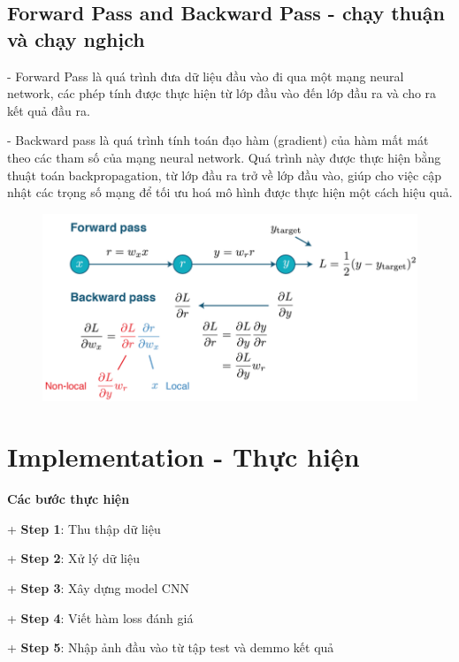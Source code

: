 \documentclass[12pt, a4paper]{article}
\begin{document}
\subsection{Forward Pass and Backward Pass - chạy thuận và chạy nghịch}
\par \hspace{1cm}- Forward Pass là quá trình đưa dữ liệu đầu vào đi qua một mạng neural network, các phép tính được thực hiện từ lớp đầu vào đến lớp đầu ra và cho ra kết quả đầu ra.
\par \hspace{1cm}- Backward pass là quá trình tính toán đạo hàm (gradient) của hàm mất mát theo các tham số của mạng neural network. Quá trình này được thực hiện bằng thuật toán backpropagation, từ lớp đầu ra trở về lớp đầu vào, giúp cho việc cập nhật các trọng số mạng để tối ưu hoá mô hình được thực hiện một cách hiệu quả.
\begin{figure}[h] %
    \centering
    \includegraphics[scale = 0.8]{Img/ForBack.png}
\end{figure}

\newpage
\section{Implementation - Thực hiện}


\par \textbf{Các bước thực hiện}
\par\hspace{0.5cm}+ \textbf{Step 1}: Thu thập dữ liệu
\par\hspace{0.5cm}+ \textbf{Step 2}: Xử lý dữ liệu
\par\hspace{0.5cm}+ \textbf{Step 3}: Xây dựng model CNN
\par\hspace{0.5cm}+ \textbf{Step 4}: Viết hàm loss đánh giá
\par\hspace{0.5cm}+ \textbf{Step 5}: Nhập ảnh đầu vào từ tập test và demmo kết quả
\end{document}
